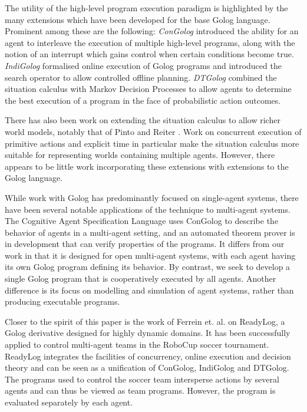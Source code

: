 \documentclass[letterpaper]{article}
\begin{document}
\label{sec:Other-Work}

The utility of the high-level program execution paradigm is highlighted
by the many extensions which have been developed for the base Golog
language. Prominent among these are the following: \emph{ConGolog}
\cite{giacomo00congolog} introduced the ability for an agent to interleave
the execution of multiple high-level programs, along with the notion
of an interrupt which gains control when certain conditions become
true. \emph{IndiGolog} \cite{giacomo99indigolog} formalised online
execution of Golog programs and introduced the search operator to
allow controlled offline planning. \emph{DTGolog} \cite{boutilier00dtgolog}
combined the situation calculus with Markov Decision Processes to
allow agents to determine the best execution of a program in the face
of probabilistic action outcomes.

There has also been work on extending the situation calculus to allow
richer world models, notably that of Pinto \cite{pinto94temporal}
and Reiter \cite{reiter96sc_nat_conc}. Work on concurrent execution
of primitive actions and explicit time in particular make the situation
calculus more suitable for representing worlds containing multiple
agents. However, there appears to be little work incorporating these
extensions with extensions to the Golog language.

While work with Golog has predominantly focused on single-agent systems,
there have been several notable applications of the technique to multi-agent
systems. The Cognitive Agent Specification Language \cite{shapiro02}
uses ConGolog to describe the behavior of agents in a multi-agent
setting, and an automated theorem prover is in development that can
verify properties of the programs. It differs from our work in that
it is designed for open multi-agent systems, with each agent having
its own Golog program defining its behavior. By contrast, we seek
to develop a single Golog program that is cooperatively executed by
all agents. Another difference is its focus on modelling and simulation
of agent systems, rather than producing executable programs.

Closer to the spirit of this paper is the work of Ferrein et. al.
\cite{Ferrein2005readylog} on ReadyLog, a Golog derivative designed
for highly dynamic domains. It has been successfully applied to control
multi-agent teams in the RoboCup soccer tournament. ReadyLog integrates
the facilities of concurrency, online execution and decision theory
and can be seen as a unification of ConGolog, IndiGolog and DTGolog.
The programs used to control the soccer team intersperse actions by
several agents and can thus be viewed as team programs. However, the
program is evaluated separately by each agent.
\end{document}
